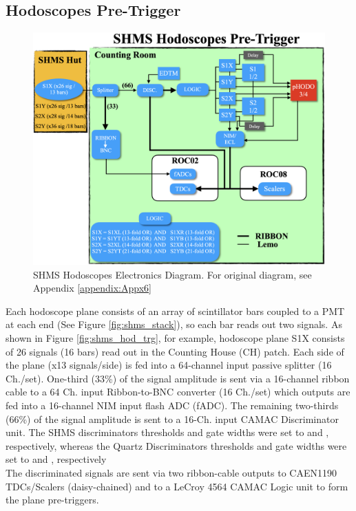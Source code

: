 \documentclass[11pt]{article}
\begin{document}
\subsection{Hodoscopes Pre-Trigger}
\begin{figure}[h!]
  \centering
  \includegraphics[scale=0.35]{pHODO_diagram.png}
  \caption{SHMS Hodoscopes Electronics Diagram. For original diagram, see Appendix \ref{appendix:Appx6}}
  \label{fig:pHODO_diagram}
\end{figure}
Each hodoscope plane consists of an array of scintillator bars coupled to a PMT at each end (See Figure \ref{fig:shms_stack}), so each bar reads out two signals. As shown in Figure \ref{fig:shms_hod_trg},
for example, hodoscope plane S1X consists of 26 signals (16 bars) read out in the Counting House (CH) patch. Each side of the plane (x13 signals/side) is fed into a 64-channel input passive splitter (16 Ch./set).
One-third (33\%) of the signal amplitude is sent via a 16-channel ribbon cable to a 64 Ch. input Ribbon-to-BNC converter (16 Ch./set) which outputs are fed into a 16-channel NIM input flash ADC (fADC).
The remaining two-thirds (66\%) of the signal amplitude is sent to a 16-Ch. input CAMAC Discriminator unit. The SHMS discriminators thresholds and gate widths were set to \shodthrs and \shodgate, respectively,
whereas the Quartz Discriminators thresholds and gate widths were set to \quartzthrs and \shodgate, respectively\\
\indent The discriminated signals are sent via two ribbon-cable outputs to CAEN1190 TDCs/Scalers (daisy-chained) and to a LeCroy 4564 CAMAC Logic unit to form the plane pre-triggers.
\end{document}
